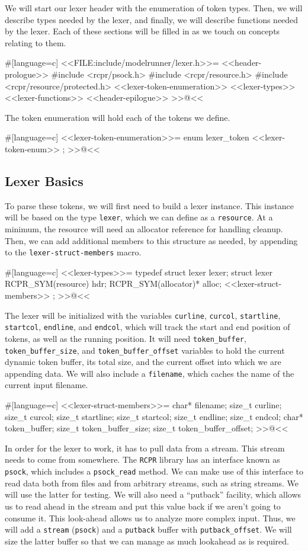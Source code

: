 We will start our lexer header with the enumeration of token types. Then, we
will describe types needed by the lexer, and finally, we will describe functions
needed by the lexer.  Each of these sections will be filled in as we touch on
concepts relating to them.

#[language=c]
<<FILE:include/modelrunner/lexer.h>>=
<<header-prologue>>
#include <rcpr/psock.h>
#include <rcpr/resource.h>
#include <rcpr/resource/protected.h>
<<lexer-token-enumeration>>
<<lexer-types>>
<<lexer-functions>>
<<header-epilogue>>
>>@<<

The token enumeration will hold each of the tokens we define.

#[language=c]
<<lexer-token-enumeration>>=
enum lexer_token
{
    <<lexer-token-enum>>
};
>>@<<

\subsection{Lexer Basics}

To parse these tokens, we will first need to build a lexer instance. This
instance will be based on the type \verb/lexer/, which we can define as a
\verb/resource/. At a minimum, the resource will need an allocator reference for
handling cleanup. Then, we can add additional members to this structure as
needed, by appending to the \verb/lexer-struct-members/ macro.

#[language=c]
<<lexer-types>>=
typedef struct lexer lexer;
struct lexer
{
    RCPR_SYM(resource) hdr;
    RCPR_SYM(allocator)* alloc;
    <<lexer-struct-members>>
};
>>@<<

The lexer will be initialized with the variables \verb/curline/, \verb/curcol/,
\verb/startline/, \verb/startcol/, \verb/endline/, and \verb/endcol/, which will
track the start and end position of tokens, as well as the running position. It
will need \verb/token_buffer/, \verb/token_buffer_size/, and
\verb/token_buffer_offset/ variables to hold the current dynamic token buffer,
its total size, and the current offset into which we are appending data. We will
also include a \verb/filename/, which caches the name of the current input
filename.

#[language=c]
<<lexer-struct-members>>=
    char* filename;
    size_t curline;
    size_t curcol;
    size_t startline;
    size_t startcol;
    size_t endline;
    size_t endcol;
    char* token_buffer;
    size_t token_buffer_size;
    size_t token_buffer_offset;
>>@<<

In order for the lexer to work, it has to pull data from a stream.  This stream
needs to come from somewhere.  The \verb/RCPR/ library has an interface known as
\verb/psock/, which includes a \verb/psock_read/ method. We can make use of this
interface to read data both from files and from arbitrary streams, such as
string streams.  We will use the latter for testing.  We will also need a
``putback'' facility, which allows us to read ahead in the stream and put this
value back if we aren't going to consume it.  This look-ahead allows us to
analyze more complex input.  Thus, we will add a \verb/stream/ (\verb/psock/)
and a \verb/putback/ buffer with \verb/putback_offset/.  We will size the latter
buffer so that we can manage as much lookahead as is required.

